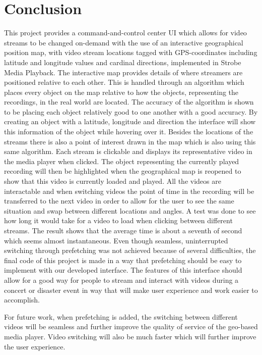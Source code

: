 \chapter{Conclusion}
\label{cha:conclusion}

This project provides a command-and-control center UI which allows for video streams to be changed on-demand with the use of an interactive geographical position map, with video stream locations tagged with GPS-coordinates including latitude and longitude values and cardinal directions, implemented in Strobe Media Playback. The interactive map provides details of where streamers are positioned relative to each other. This is handled through an algorithm which places every object on the map relative to how the objects, representing the recordings, in the real world are located. The accuracy of the algorithm is shown to be placing each object relatively good to one another with a good accuracy. By creating an object with a latitude, longitude and direction the interface will show this information of the object while hovering over it. Besides the locations of the streams there is also a point of interest drawn in the map which is also using this same algorithm. Each stream is clickable and displays its representative video in the media player when clicked. The object representing the currently played recording will then be highlighted when the geographical map is reopened to show that this video is currently loaded and played. All the videos are interactable and when switching videos the point of time in the recording will be transferred to the next video in order to allow for the user to see the same situation and swap between different locations and angles. A test was done to see how long it would take for a video to load when clicking between different streams. The result shows that the average time is about a seventh of second which seems almost instantaneous. Even though seamless, uninterrupted switching through prefetching was not achieved because of several difficulties, the final code of this project is made in a way that prefetching should be easy to implement with our developed interface. The features of this interface should allow for a good way for people to stream and interact with videos during a concert or disaster event in way that will make user experience and work easier to accomplish. 

For future work, when prefetching is added, the switching between different videos will be seamless and further improve the quality of service of the geo-based media player. Video switching will also be much faster which will further improve the user experience.